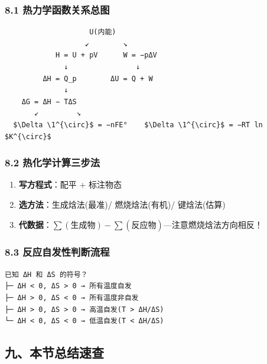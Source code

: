 \documentclass[a4paper,11pt]{ctexart}
\providecommand{\tightlist}{\setlength{\itemsep}{0pt}\setlength{\parskip}{0pt}}
\begin{document}
\subsubsection{8.1 热力学函数关系总图}\label{ux70edux529bux5b66ux51fdux6570ux5173ux7cfbux603bux56fe}

\begin{verbatim}
                    U(内能)
                   ↙        ↘
            H = U + pV      W = −pΔV
              ↓                ↓
         ΔH = Q_p        ΔU = Q + W
              ↓
    ΔG = ΔH − TΔS
       ↙         ↘
  $\Delta \1^{\circ}$ = −nFE°    $\Delta \1^{\circ}$ = −RT ln $K^{\circ}$
\end{verbatim}

\subsubsection{8.2 热化学计算三步法}\label{ux70edux5316ux5b66ux8ba1ux7b97ux4e09ux6b65ux6cd5}

\begin{enumerate}
\def\labelenumi{\arabic{enumi}.}
\tightlist
\item
  \textbf{写方程式}：配平 + 标注物态
\item
  \textbf{选方法}：生成焓法(最准)/ 燃烧焓法(有机)/ 键焓法(估算)
\item
  \textbf{代数据}：\(\sum(\text{生成物}) - \sum(\text{反应物})\)---注意燃烧焓法方向相反！
\end{enumerate}

\subsubsection{8.3 反应自发性判断流程}\label{ux53cdux5e94ux81eaux53d1ux6027ux5224ux65adux6d41ux7a0b}

\begin{verbatim}
已知 ΔH 和 ΔS 的符号？
├─ ΔH < 0, ΔS > 0 → 所有温度自发
├─ ΔH > 0, ΔS < 0 → 所有温度非自发
├─ ΔH > 0, ΔS > 0 → 高温自发(T > ΔH/ΔS)
└─ ΔH < 0, ΔS < 0 → 低温自发(T < ΔH/ΔS)
\end{verbatim}

\subsection{九、本节总结速查}\label{ux4e5dux672cux8282ux603bux7ed3ux901fux67e5}
\end{document}
